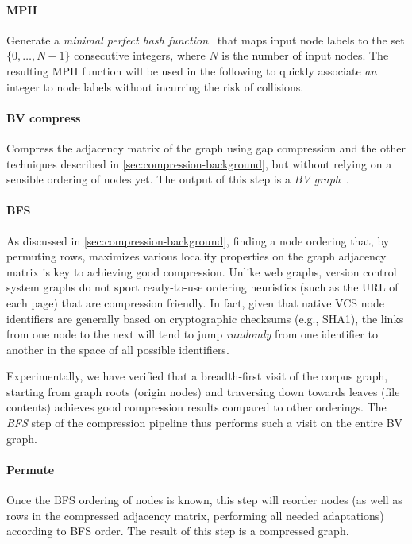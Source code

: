 \paragraph{MPH}
Generate a \emph{minimal perfect hash function}~\cite{GOVFSCF} that maps input
node labels to the set $\{0,\ldots,N-1\}$ consecutive integers, where $N$ is
the number of input nodes. The resulting MPH function will be used in the
following to quickly associate \emph{an} integer to node labels without
incurring the risk of collisions.

\paragraph{BV compress}
Compress the adjacency matrix of the graph using gap compression and the other
techniques described in \cref{sec:compression-background}, but without
relying on a sensible ordering of nodes yet. The output of this step is a
\emph{BV graph}~\cite{BoVWFI}.

\paragraph{BFS}
As discussed in \cref{sec:compression-background}, finding a node
ordering that, by permuting rows, maximizes various locality properties on the
graph adjacency matrix is key to achieving good compression. Unlike web
graphs, version control system graphs do not sport ready-to-use ordering
heuristics (such as the URL of each page) that are compression friendly. In
fact, given that native VCS node identifiers are generally based on
cryptographic checksums (e.g., SHA1), the links from one node to the next will
tend to jump \emph{randomly} from one identifier to another in the space of all
possible identifiers.

Experimentally, we have verified that a breadth-first visit of the corpus graph,
starting from graph roots (origin nodes) and traversing down towards leaves
(file contents) achieves good compression results compared to other orderings.
The \emph{BFS} step of the compression pipeline thus performs such a visit on
the entire BV graph.

\paragraph{Permute}
Once the BFS ordering of nodes is known, this step will reorder nodes (as well
as rows in the compressed adjacency matrix, performing all needed adaptations)
according to BFS order. The result of this step is a compressed graph.

